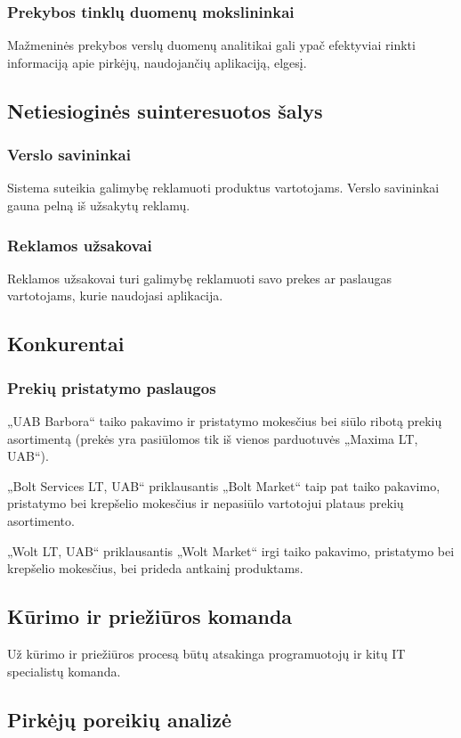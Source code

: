 \documentclass{article}
\begin{document}
\subsubsection*{Prekybos tinklų duomenų mokslininkai}
	Mažmeninės prekybos verslų duomenų analitikai gali ypač efektyviai rinkti informaciją apie pirkėjų, naudojančių aplikaciją, elgesį.
\subsection*{Netiesioginės suinteresuotos šalys}
\subsubsection*{Verslo savininkai}
	Sistema suteikia galimybę reklamuoti produktus vartotojams. Verslo savininkai gauna pelną iš užsakytų reklamų.
\subsubsection*{Reklamos užsakovai}
	Reklamos užsakovai turi galimybę reklamuoti savo prekes ar paslaugas vartotojams, kurie naudojasi aplikacija. 
\subsection*{Konkurentai}
\subsubsection*{Prekių pristatymo paslaugos}
	„UAB Barbora“ taiko pakavimo ir pristatymo mokesčius bei siūlo ribotą prekių asortimentą (prekės yra pasiūlomos tik iš vienos parduotuvės „Maxima LT, UAB“).\par
„Bolt Services LT, UAB“ priklausantis „Bolt Market“ taip pat taiko pakavimo, pristatymo bei krepšelio mokesčius ir nepasiūlo vartotojui plataus prekių asortimento.\par
„Wolt LT, UAB“ priklausantis „Wolt Market“ irgi taiko pakavimo, pristatymo bei krepšelio mokesčius, bei prideda antkainį produktams.
\subsection*{Kūrimo ir priežiūros komanda}
	Už kūrimo ir priežiūros procesą būtų atsakinga programuotojų ir kitų IT specialistų komanda.
	\pagebreak

\subsection{Pirkėjų poreikių analizė}
\end{document}
